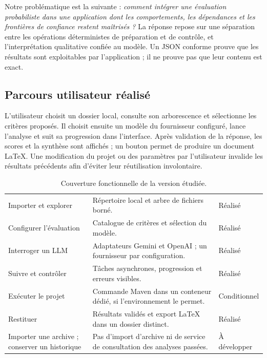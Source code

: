Notre problématique est la suivante : \emph{comment intégrer une évaluation probabiliste dans une application dont les comportements, les dépendances et les frontières de confiance restent maîtrisés ?} La réponse repose sur une séparation entre les opérations déterministes de préparation et de contrôle, et l'interprétation qualitative confiée au modèle. Un JSON conforme prouve que les résultats sont exploitables par l'application ; il ne prouve pas que leur contenu est exact.

\subsection{Parcours utilisateur réalisé}
L'utilisateur choisit un dossier local, consulte son arborescence et sélectionne les critères proposés. Il choisit ensuite un modèle du fournisseur configuré, lance l'analyse et suit sa progression dans l'interface. Après validation de la réponse, les scores et la synthèse sont affichés ; un bouton permet de produire un document LaTeX. Une modification du projet ou des paramètres par l'utilisateur invalide les résultats précédents afin d'éviter leur réutilisation involontaire.

\begin{table}[H]
\small
\begin{tabularx}{\textwidth}{@{}P{37mm}YP{24mm}@{}}
\toprule
{} &  & \\
\midrule
Importer et explorer & Répertoire local et arbre de fichiers borné. & Réalisé\\
Configurer l'évaluation & Catalogue de critères et sélection du modèle. & Réalisé\\
Interroger un LLM & Adaptateurs Gemini et OpenAI ; un fournisseur par configuration. & Réalisé\\
Suivre et contrôler & Tâches asynchrones, progression et erreurs visibles. & Réalisé\\
Exécuter le projet & Commande Maven dans un conteneur dédié, si l'environnement le permet. & Conditionnel\\
Restituer & Résultats validés et export LaTeX dans un dossier distinct. & Réalisé\\
Importer une archive ; conserver un historique & Pas d'import d'archive ni de service de consultation des analyses passées. & À développer\\
\bottomrule
\end{tabularx}
\caption{Couverture fonctionnelle de la version étudiée.}
\end{table}

